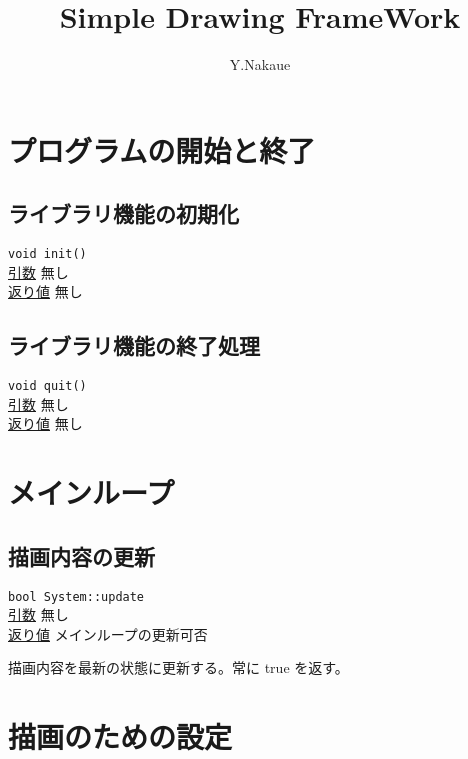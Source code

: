 \documentclass[a4paper, 11pt, oneside, onecolumn, openany]{jsarticle}
\begin{document}

\newcommand{\function}[3]{
  \noindent
  \tab \texttt{#1} \\
  \tab \underline{引数} \tab #2 \\
  \tab \underline{返り値} \tab #3 \\\par
}

\title{\vspace{-3cm}Simple Drawing FrameWork}
\author{Y.Nakaue}
\maketitle


\section{プログラムの開始と終了}
\subsection{ライブラリ機能の初期化}
\function{void init()}{無し}{無し}

\subsection{ライブラリ機能の終了処理}
\function{void quit()}{無し}{無し}


\section{メインループ}
\subsection{描画内容の更新}
\function{bool System::update}{無し}{メインループの更新可否}
描画内容を最新の状態に更新する。常に true を返す。


\section{描画のための設定}
\end{document}
